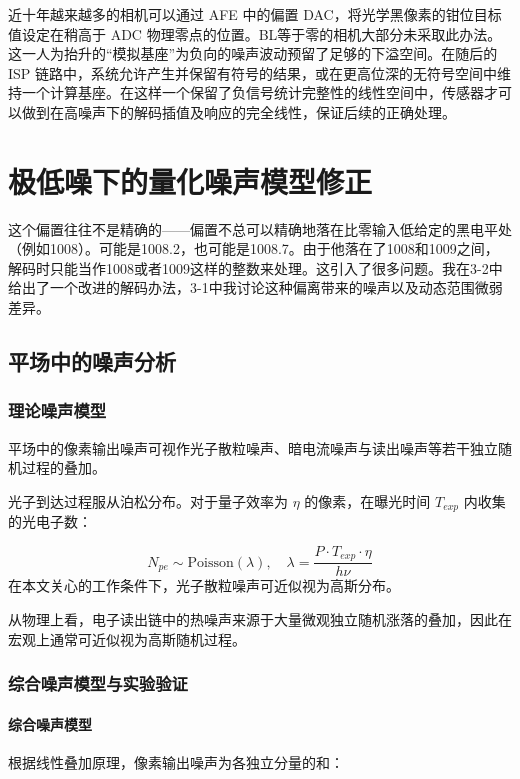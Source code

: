\documentclass[journal]{IEEEtran}
\begin{document}
近十年越来越多的相机可以通过 AFE 中的偏置 DAC，将光学黑像素的钳位目标值设定在稍高于 ADC 物理零点的位置。BL等于零的相机大部分未采取此办法。这一人为抬升的“模拟基座”为负向的噪声波动预留了足够的下溢空间。在随后的 ISP 链路中，系统允许产生并保留有符号的结果，或在更高位深的无符号空间中维持一个计算基座。在这样一个保留了负信号统计完整性的线性空间中，传感器才可以做到在高噪声下的解码插值及响应的完全线性，保证后续的正确处理。


\section{极低噪下的量化噪声模型修正}


这个偏置往往不是精确的——偏置不总可以精确地落在比零输入低给定的黑电平处（例如1008）。可能是1008.2，也可能是1008.7。由于他落在了1008和1009之间，解码时只能当作1008或者1009这样的整数来处理。这引入了很多问题。我在3-2中给出了一个改进的解码办法，3-1中我讨论这种偏离带来的噪声以及动态范围微弱差异。

\subsection{平场中的噪声分析}


\subsubsection{理论噪声模型}


平场中的像素输出噪声可视作光子散粒噪声、暗电流噪声与读出噪声等若干独立随机过程的叠加。


光子到达过程服从泊松分布。对于量子效率为 $\eta$ 的像素，在曝光时间 $T_{exp}$ 内收集的光电子数：

\[
N_{pe} \sim \text{Poisson}(\lambda), \quad \lambda = \frac{P \cdot T_{exp} \cdot \eta}{h\nu}
\]
在本文关心的工作条件下，光子散粒噪声可近似视为高斯分布。

从物理上看，电子读出链中的热噪声来源于大量微观独立随机涨落的叠加，因此在宏观上通常可近似视为高斯随机过程。

\subsubsection{综合噪声模型与实验验证}


\paragraph{综合噪声模型}


根据线性叠加原理，像素输出噪声为各独立分量的和： 
\end{document}
